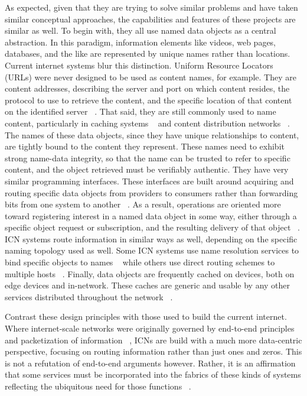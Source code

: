 As expected, given that they are trying to solve similar problems and have taken similar conceptual approaches, the capabilities and features of these projects are similar as well.  To begin with, they all use named data objects as a central abstraction.  In this paradigm, information elements like videos, web pages, databases, and the like are represented by unique names rather than locations.  Current internet systems blur this distinction.  Uniform Resource Locators (URLs) were never designed to be used as content names, for example.  They are content addresses, describing the server and port on which content resides, the protocol to use to retrieve the content, and the specific location of that content on the identified server ~\cite{rfc3986}.  That said, they are still commonly used to name content, particularly in caching systems ~\cite{rfc2616} and content distribution networks ~\cite{Nygren:2010:ANP:1842733.1842736}.  The names of these data objects, since they have unique relationships to content, are tightly bound to the content they represent.  These names need to exhibit strong name-data integrity, so that the name can be trusted to refer to specific content, and the object retrieved must be verifiably authentic.  They have very similar programming interfaces.  These interfaces are built around acquiring and routing specific data objects from providers to consumers rather than forwarding bits from one system to another ~\cite{rfc791,rfc793}.  As a result, operations are oriented more toward registering interest in a named data object in some way, either through a specific object request or subscription, and the resulting delivery of that object ~\cite{6231276}.  ICN systems route information in similar ways as well, depending on the specific naming topology used as well.  Some ICN systems use name resolution services to bind specific objects to names ~\cite{4698847} while others use direct routing schemes to multiple hosts ~\cite{Ghodsi:2011:NCA:2018584.2018586}.  Finally, data objects are frequently cached on devices, both on edge devices and in-network.  These caches are generic and usable by any other services distributed throughout the network ~\cite{6231276}.

Contrast these design principles with those used to build the current internet.  Where internet-scale networks were originally governed by end-to-end principles and packetization of information ~\cite{Cl:88,SaReCl:84}, ICNs are build with a much more data-centric perspective, focusing on routing information rather than just ones and zeros.  This is not a refutation of end-to-end arguments however.  Rather, it is an affirmation that some services must be incorporated into the fabrics of these kinds of systems reflecting the ubiquitous need for those functions ~\cite{BlCl:01}.

